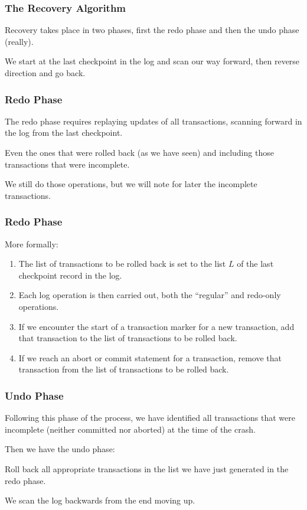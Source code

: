 \begin{frame}
\frametitle{The Recovery Algorithm}

Recovery takes place in two phases, first the redo phase and then the undo phase (really). 

We start at the last checkpoint in the log and scan our way forward, then reverse direction and go back. 

\end{frame}


\begin{frame}
\frametitle{Redo Phase}

The \alert{redo phase} requires replaying updates of all transactions, scanning forward in the log from the last checkpoint. 

Even the ones that were rolled back (as we have seen) and including those transactions that were incomplete. 

We still do those operations, but we will note for later the incomplete transactions. 

\end{frame}

\begin{frame}
\frametitle{Redo Phase}

More formally:

\begin{enumerate}
	\item The list of transactions to be rolled back is set to the list $L$ of the last checkpoint record in the log.
	\item Each log operation is then carried out, both the ``regular'' and redo-only operations.
	\item If we encounter the start of a transaction marker for a new transaction, add that transaction to the list of transactions to be rolled back.
	\item If we reach an abort or commit statement for a transaction, remove that transaction from the list of transactions to be rolled back.
\end{enumerate}


\end{frame}

\begin{frame}
\frametitle{Undo Phase}

Following this phase of the process, we have identified all transactions that were incomplete (neither committed nor aborted) at the time of the crash. 

Then we have the \alert{undo phase}: 

Roll back all appropriate transactions in the list we have just generated in the redo phase. 

We scan the log backwards from the end moving up.

\end{frame}


